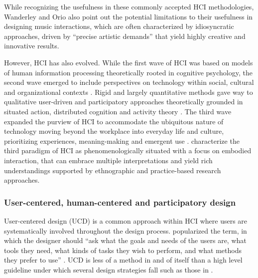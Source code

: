 \documentclass[letterpaper, 12pt]{article}
\begin{document}
While recognizing the usefulness in these commonly accepted HCI methodologies, Wanderley and Orio also point out the potential limitations to their usefulness in designing music interactions, which are often characterized by idiosyncratic approaches, driven by ``precise artistic demands'' \citep*[p. 67]{Wanderley2002} that yield highly creative and innovative results.

However, HCI has also evolved. While the first wave of HCI was based on models of human information processing theoretically rooted in cognitive psychology, the second wave emerged to include perspectives on technology within social, cultural and organizational contexts \citep{kaptelinin2003}. Rigid and largely quantitative methods gave way to qualitative user-driven and participatory approaches theoretically grounded in situated action, distributed cognition and activity theory \citep{Bodker2006}. The third wave expanded the purview of HCI to accommodate the ubiquitous nature of technology moving beyond the workplace into everyday life and culture, prioritizing experiences, meaning-making and emergent use \citep{Bodker2015}. \citet{Harrison2007} characterize the third paradigm of HCI as phenomenologically situated with a focus on embodied interaction, that can embrace multiple interpretations and yield rich understandings supported by ethnographic and practice-based research approaches.

\subsubsection{User-centered, human-centered and participatory design}
\label{ch3-sec:user-centered-design}

User-centered design (UCD) is a common approach within HCI where users are systematically involved throughout the design process. \citet{Norman1988} popularized the term, in which the designer should ``ask what the goals and needs of the users are, what tools they need, what kinds of tasks they wish to perform, and what methods they prefer to use'' \citep[as cited in][p. 44]{El-shimy2014}. UCD is less of a method in and of itself than a high level guideline under which several design strategies fall such as those in \citet{greenberg2011sketching}. 
\end{document}
